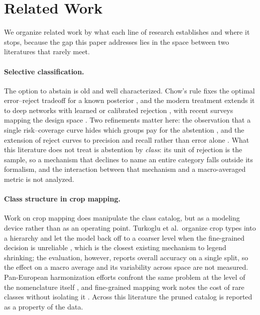 \section{Related Work}
\label{sec:related}

We organize related work by what each line of research establishes and where it stops, because the
gap this paper addresses lies in the space between two literatures that rarely meet.

\paragraph{Selective classification.}
The option to abstain is old and well characterized. Chow's rule fixes the optimal
error--reject tradeoff for a known posterior \cite{chow1970reject}, and the modern treatment
extends it to deep networks with learned or calibrated rejection
\cite{geifman2017selective,geifman2019selectivenet,liu2019deepgamblers}, with recent surveys
mapping the design space \cite{hendrickx2024rejectsurvey,hasan2023uncertaintysurvey}. Two
refinements matter here: the observation that a single risk--coverage curve hides which groups pay
for the abstention \cite{jones2020selectivedisparities}, and the extension of reject curves to
precision and recall rather than error alone \cite{fischer2023rejectcurves,pugnana2022aucselective}.
What this literature does not treat is abstention by \emph{class}: its unit of rejection is the
sample, so a mechanism that declines to name an entire category falls outside its formalism, and
the interaction between that mechanism and a macro-averaged metric is not analyzed.

\paragraph{Class structure in crop mapping.}
Work on crop mapping does manipulate the class catalog, but as a modeling device rather than as an
operating point. Turkoglu et al.\ organize crop types into a hierarchy and let the model back off
to a coarser level when the fine-grained decision is unreliable \cite{turkoglu2021hierarchies},
which is the closest existing mechanism to legend shrinking; the evaluation, however, reports
overall accuracy on a single split, so the effect on a macro average and its variability across
space are not measured. Pan-European harmonization efforts confront the same problem at the level
of the nomenclature itself \cite{schneider2021eurocrops,claverie2026eurocropsv2}, and fine-grained
mapping work notes the cost of rare classes without isolating it
\cite{lei2025finecrop,li2021costeffective,donmez2025cropcover}. Across this literature the pruned
catalog is reported as a property of the data.

